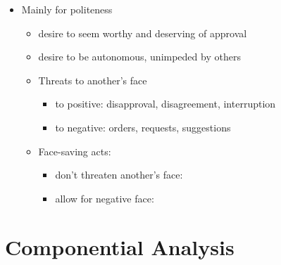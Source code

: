 \documentclass[headrule,footrule]{foils}
\begin{document}

\begin{itemize}
\item Mainly for politeness
\begin{itemize}
\item {} desire to seem worthy and deserving of approval
\item {} desire to be autonomous, unimpeded by others
\item Threats to another’s face
  \begin{itemize}
  \item to positive: disapproval, disagreement, interruption
  \item to negative: orders, requests, suggestions
  \end{itemize}
\item Face-saving acts: 
  \begin{itemize}
  \item don't threaten another’s face: 
  \item allow for negative face: 
  \end{itemize}

\end{itemize}
\end{itemize}


\section{Componential Analysis}
\end{document}
